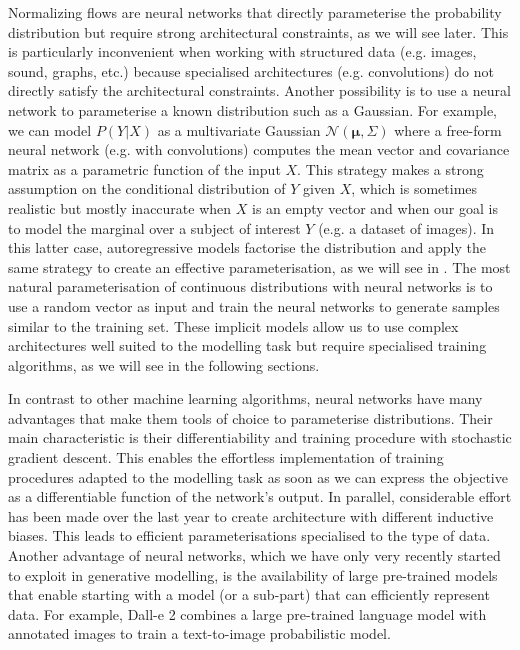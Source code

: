 Normalizing flows are neural networks that directly parameterise the probability distribution but require strong architectural constraints, as we will see later. This is particularly inconvenient when working with structured data (e.g. images, sound, graphs, etc.) because specialised architectures (e.g. convolutions) do not directly satisfy the architectural constraints. Another possibility is to use a neural network to parameterise a known distribution such as a Gaussian. For example, we can model $P(Y|X)$ as a multivariate Gaussian $\mathcal{N}(\bm{\mu}, \Sigma)$ where a free-form neural network (e.g. with convolutions) computes the mean vector and covariance matrix as a parametric function of the input $X$. This strategy makes a strong assumption on the conditional distribution of $Y$ given $X$, which is sometimes realistic but mostly inaccurate when $X$ is an empty vector and when our goal is to model the marginal over a subject of interest $Y$ (e.g. a dataset of images). In this latter case, autoregressive models factorise the distribution and apply the same strategy to create an effective parameterisation, as we will see in . The most natural parameterisation of continuous distributions with neural networks is to use a random vector as input and train the neural networks to generate samples similar to the training set. These implicit models allow us to use complex architectures well suited to the modelling task but require specialised training algorithms, as we will see in the following sections.

In contrast to other machine learning algorithms, neural networks have many advantages that make them tools of choice to parameterise distributions. Their main characteristic is their differentiability and training procedure with stochastic gradient descent. This enables the effortless implementation of training procedures adapted to the modelling task as soon as we can express the objective as a differentiable function of the network's output. In parallel, considerable effort has been made over the last year to create architecture with different inductive biases. This leads to efficient parameterisations specialised to the type of data. Another advantage of neural networks, which we have only very recently started to exploit in generative modelling, is the availability of large pre-trained models that enable starting with a model (or a sub-part) that can efficiently represent data. For example, Dall-e 2 combines a large pre-trained language model with annotated images to train a text-to-image probabilistic model.

